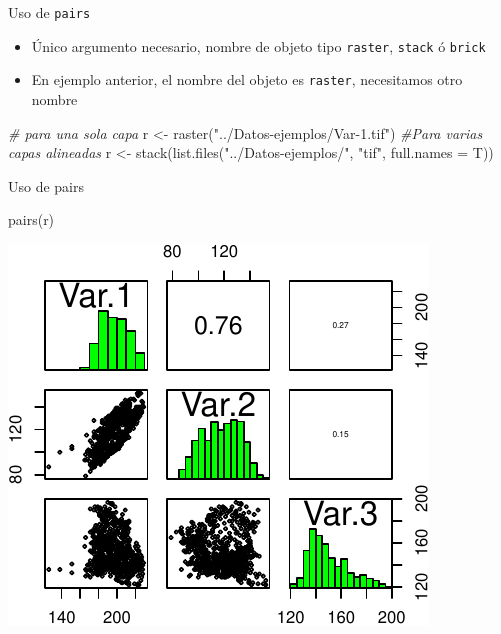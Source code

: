 \documentclass[
  11pt,
  ignorenonframetext,
]{beamer}
\newenvironment{Shaded}{}{}
\newcommand{\AttributeTok}[1]{\textcolor[rgb]{0.49,0.56,0.16}{#1}}
\newcommand{\CommentTok}[1]{\textcolor[rgb]{0.38,0.63,0.69}{\textit{#1}}}
\newcommand{\FunctionTok}[1]{\textcolor[rgb]{0.02,0.16,0.49}{#1}}
\newcommand{\NormalTok}[1]{#1}
\newcommand{\OtherTok}[1]{\textcolor[rgb]{0.00,0.44,0.13}{#1}}
\newcommand{\StringTok}[1]{\textcolor[rgb]{0.25,0.44,0.63}{#1}}
\begin{document}
\begin{frame}[fragile]{Uso de \texttt{pairs}}
\protect\hypertarget{uso-de-pairs}{}
\begin{itemize}
\item
  Único argumento necesario, nombre de objeto tipo \texttt{raster},
  \texttt{stack} ó \texttt{brick}
\item
  En ejemplo anterior, el nombre del objeto es \texttt{raster},
  necesitamos otro nombre
\end{itemize}

\begin{Shaded}
\begin{Highlighting}[]
\CommentTok{\# para una sola capa}
\NormalTok{r }\OtherTok{\textless{}{-}} \FunctionTok{raster}\NormalTok{(}\StringTok{"../Datos{-}ejemplos/Var{-}1.tif"}\NormalTok{) }
\CommentTok{\#Para varias capas alineadas}
\NormalTok{r }\OtherTok{\textless{}{-}} \FunctionTok{stack}\NormalTok{(}\FunctionTok{list.files}\NormalTok{(}\StringTok{"../Datos{-}ejemplos/"}\NormalTok{, }
                      \StringTok{"tif"}\NormalTok{, }\AttributeTok{full.names =}\NormalTok{ T))}
\end{Highlighting}
\end{Shaded}
\end{frame}

\begin{frame}[fragile]{Uso de pairs}
\protect\hypertarget{uso-de-pairs-1}{}
\begin{Shaded}
\begin{Highlighting}[]
\FunctionTok{pairs}\NormalTok{(r)}
\end{Highlighting}
\end{Shaded}

\begin{center}\includegraphics{Correlacion-espacial_files/figure-beamer/unnamed-chunk-6-1} \end{center}
\end{frame}
\end{document}

